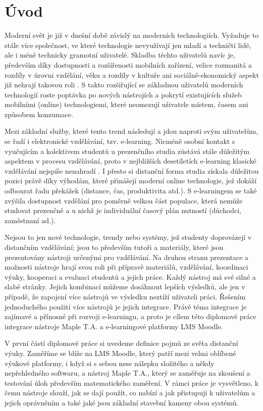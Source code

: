 \documentclass[
print,
  11pt,
  table,   
  nolof,    
  nolot,
  oneside,
  draft
]{fithesis3}
\begin{document}
\chapter{Úvod}


Moderní svět je již v dnešní době závislý na moderních technologiích. Vyžaduje to stále více společnost, ve které technologie nevyužívají jen mladí a techničtí lidé, ale i méně technicky gramotní uživatelé. Skladba těchto uživatelů navíc je, především díky dostupnosti a rozšířenosti mobilních zařízení, velice rozmanitá a rozdíly v úrovni vzdělání, věku a rozdíly v kultuře ani sociálně-ekonomický aspekt již nehrají takovou roli \cite{itustats}. S takto rozšiřující se základnou uživatelů moderních technologií roste poptávka po nových nástrojích a pokrytí existujících služeb mobilními (online) technologiemi, které neomezují uživatele místem, časem ani způsobem konzumace.


Mezi základní služby, které tento trend následují a jdou naproti svým uživatelům, se řadí i elektronické vzdělávání, tzv. e-learning. Nicméně osobní kontakt s vyučujícím a kolektivem studentů u prezenčního studia zůstává stále důležitým aspektem v procesu vzdělávání, proto v nejbližších desetiletích e-learning klasické vzdělávání nejspíše nenahradí \cite{techvsteach}. I přesto si distanční forma studia získala důležitou pozici právě díky výhodám, které přinášejí moderní online technologie, jež dokáží odbourat řadu překážek (distance, čas, produktivita atd.). S e-learningem se také zvýšila dostupnost vzdělání pro poměrně velkou část populace, která nemůže studovat prezenčně a u nichž je individuální časový plán nutností (důchodci, zaměstnaní ad.).

Nejsou to jen nové technologie, trendy nebo systémy, jež studenty doprovázejí v distančním vzdělávání; jsou to především tutoři a materiály, které jsou prezentovány nástroji určenými pro vzdělávání. Na druhou stranu prezentace a možnosti nástroje hrají svou roli při přípravě materiálů, vzdělávání, koordinaci výuky, kooperaci a evaluaci studentů a jejich práce. Každý nástroj má své silné a slabé stránky. Jejich kombinací můžeme dosáhnout lepších výsledků, ale jen v případě, že zapojení více nástrojů ve výsledku neztíží uživateli práci. Řešením jednoduchého použití více nástrojů je jejich integrace. Právě téma integrace je zajímavé a přínosné při rozvoji e-learningu, a proto je cílem této diplomové práce integrace nástroje Maple T.A. a e-learningové platformy LMS Moodle.

V první částí diplomové práce si uvedeme definice pojmů ze světa distanční výuky. Zaměříme se blíže na LMS Moodle, který patří mezi velmi oblíbené výukové platformy, i když si s sebou nese nálepku složitého a někdy nepřehledného softwaru, a nástroj Maple T.A., který se zaměřuje na zkoušení a testování úloh především matematického zaměření. V rámci práce je vysvětleno, k čemu nástroje slouží, jak se dají použít, co nabízí a jak přistupují k uživatelům a jejich oprávněním a také jaké jsou základní stavební kameny obou systémů.
\end{document}

